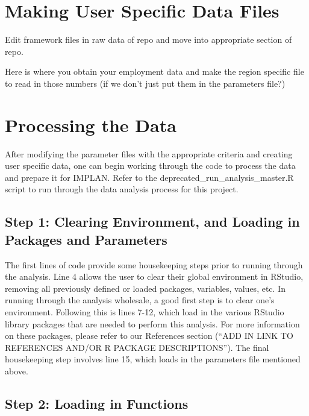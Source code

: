 \documentclass[
]{book}
\begin{document}
\hypertarget{making-user-specific-data-files}{%
\section{Making User Specific Data Files}\label{making-user-specific-data-files}}

Edit framework files in raw data of repo and move into appropriate section of repo.

Here is where you obtain your employment data and make the region specific file to read in those numbers (if we don't just put them in the parameters file?)

\hypertarget{processing-the-data}{%
\section{Processing the Data}\label{processing-the-data}}

After modifying the parameter files with the appropriate criteria and creating user specific data, one can begin working through the code to process the data and prepare it for IMPLAN. Refer to the deprecated\_run\_analysis\_master.R script to run through the data analysis process for this project.

\hypertarget{step-1-clearing-environment-and-loading-in-packages-and-parameters}{%
\subsection{Step 1: Clearing Environment, and Loading in Packages and Parameters}\label{step-1-clearing-environment-and-loading-in-packages-and-parameters}}

The first lines of code provide some housekeeping steps prior to running through the analysis. Line 4 allows the user to clear their global environment in RStudio, removing all previously defined or loaded packages, variables, values, etc. In running through the analysis wholesale, a good first step is to clear one's environment. Following this is lines 7-12, which load in the various RStudio library packages that are needed to perform this analysis. For more information on these packages, please refer to our References section (``ADD IN LINK TO REFERENCES AND/OR R PACKAGE DESCRIPTIONS''). The final housekeeping step involves line 15, which loads in the parameters file mentioned above.

\hypertarget{step-2-loading-in-functions}{%
\subsection{Step 2: Loading in Functions}\label{step-2-loading-in-functions}}
\end{document}
